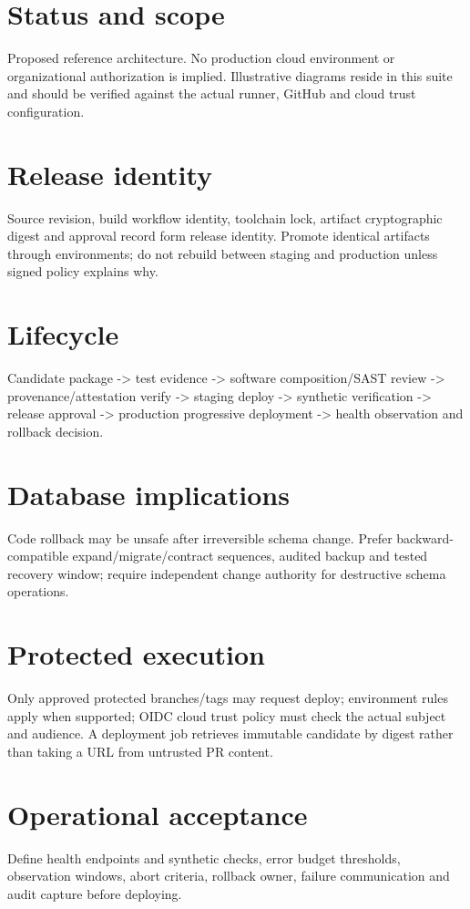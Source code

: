 \documentclass[11pt,letterpaper]{article}
\begin{document}
\makedoctitle
\makedocsummary
\tableofcontents
\clearpage
\section{Status and scope}
Proposed reference architecture. No production cloud environment or organizational authorization is implied. Illustrative diagrams reside in this suite and should be verified against the actual runner, GitHub and cloud trust configuration.

\section{Release identity}
Source revision, build workflow identity, toolchain lock, artifact cryptographic digest and approval record form release identity. Promote identical artifacts through environments; do not rebuild between staging and production unless signed policy explains why.

\section{Lifecycle}
Candidate package -> test evidence -> software composition/SAST review -> provenance/attestation verify -> staging deploy -> synthetic verification -> release approval -> production progressive deployment -> health observation and rollback decision.

\section{Database implications}
Code rollback may be unsafe after irreversible schema change. Prefer backward-compatible expand/migrate/contract sequences, audited backup and tested recovery window; require independent change authority for destructive schema operations.

\section{Protected execution}
Only approved protected branches/tags may request deploy; environment rules apply when supported; OIDC cloud trust policy must check the actual subject and audience. A deployment job retrieves immutable candidate by digest rather than taking a URL from untrusted PR content.

\section{Operational acceptance}
Define health endpoints and synthetic checks, error budget thresholds, observation windows, abort criteria, rollback owner, failure communication and audit capture before deploying.
\end{document}

